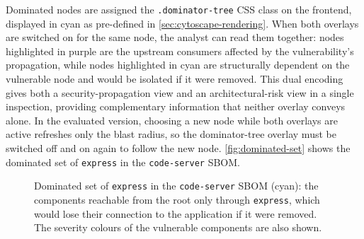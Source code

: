 Dominated nodes are assigned the \texttt{.dominator-tree} CSS class on the frontend, displayed in cyan as pre-defined in \autoref{sec:cytoscape-rendering}. When both overlays are switched on for the same node, the analyst can read them together: nodes highlighted in purple are the upstream consumers affected by the vulnerability's propagation, while nodes highlighted in cyan are structurally dependent on the vulnerable node and would be isolated if it were removed. This dual encoding gives both a security-propagation view and an architectural-risk view in a single inspection, providing complementary information that neither overlay conveys alone. In the evaluated version, choosing a new node while both overlays are active refreshes only the blast radius, so the dominator-tree overlay must be switched off and on again to follow the new node. \autoref{fig:dominated-set} shows the dominated set of \texttt{express} in the \texttt{code-server} SBOM.

\begin{figure}[!htpb]
    \centering
    \caption[Dominated set]{Dominated set of \texttt{express} in the \texttt{code-server} SBOM (cyan): the components reachable from the root only through \texttt{express}, which would lose their connection to the application if it were removed. The severity colours of the vulnerable components are also shown.}
    \label{fig:dominated-set}
\end{figure}
